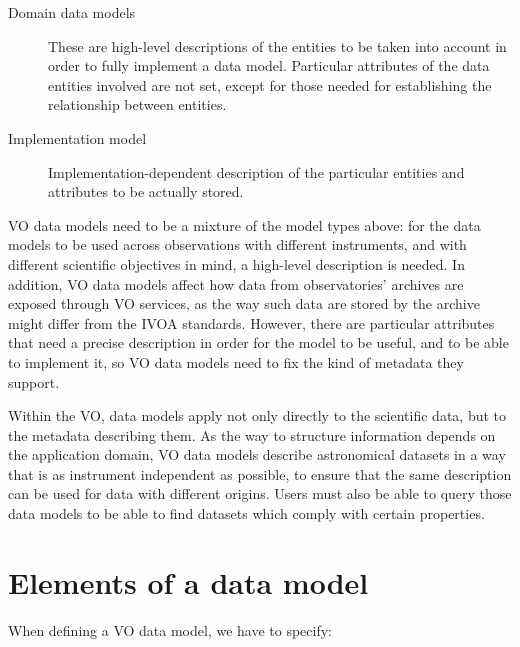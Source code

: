 	\begin{description}
		\item[Domain data models] These are high-level descriptions
		of the entities to be taken into account in order to fully
		implement a data model. Particular attributes of the data
		entities involved are not set, except for those needed for
		establishing the relationship between entities.
		
		\item[Implementation model] Implementation-dependent
		description of the particular entities and attributes to be
		actually stored.
	\end{description}
	
	 VO data models need to be a mixture of the model types above:
	for the data models to be used across observations with
	different instruments, and with different scientific objectives
	in mind, a high-level description is needed. In addition, VO
	data models affect how data from observatories' archives are
	exposed through VO services, as the way such
	data are stored by the archive might differ from the IVOA
	standards. 
	However, there are
	particular attributes that need a precise description in order
	for the model to be useful, and to be able to implement it,
	so VO data models need to fix the kind of metadata they
	support.
	
	 Within the VO, data models apply not only directly to the
	scientific data, but to the metadata describing them. As the
	way to structure information depends on the application domain,
	VO data models describe astronomical datasets in a way that is
	as instrument independent as possible, to ensure that the same
	description can be used for data with different origins.
	Users must also be able to query those data models to be able
	to find datasets which comply with certain properties.
	
	\section{Elements of a data model} %
	\label{sec:data_model_elements}
	
		When defining a VO data model, we have to specify:
	
